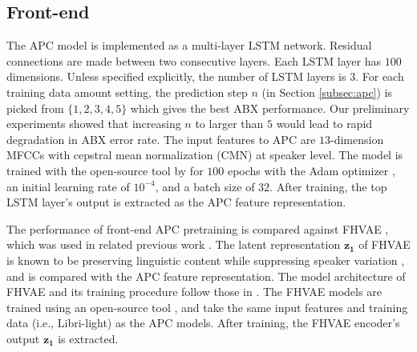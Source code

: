 \documentclass[a4paper]{article}
\begin{document}
\subsection{Front-end}
\label{subsec:exp_setup_apc_fhvae}
The APC model is implemented as a  multi-layer  LSTM network. Residual connections are made between two consecutive layers.  
Each LSTM layer has $100$ dimensions.
Unless specified explicitly, the number of LSTM layers is $3$.
For each training data amount setting,
the
prediction step $n$ (in Section \ref{subsec:apc}) is
picked from $\{1,2,3,4,5\}$ which gives the best ABX performance.
Our preliminary experiments showed that increasing $n$ to larger than $5$ would lead to rapid degradation in ABX error rate. 
The input features to APC are $13$-dimension MFCCs with cepstral mean normalization (CMN) at speaker level. 
The model is trained with the open-source tool by \cite{Chung2019} for $100$ epochs with the Adam optimizer \cite{kingma2014adam}, an initial learning rate of $10^{-4}$, and a batch size of $32$. 
After training, the top LSTM layer's output is extracted as the APC feature representation.

The performance of front-end  APC pretraining is compared against FHVAE \cite{hsu2017nips}, which was used in related previous work \cite{Feng2019improving}. 
The latent representation $\bm{z_1}$ of FHVAE is known to be preserving linguistic content while suppressing speaker variation \cite{hsu2017nips}, and is compared with the APC feature representation. The model architecture of FHVAE and its training procedure follow those in \cite{Feng2019improving}.
The FHVAE models are trained 
using an open-source tool \cite{hsu2017nips}, and take the same input features and training data (i.e., Libri-light) as the APC models. After training, the  FHVAE encoder's output $\bm{z_1}$ is extracted.
\end{document}
